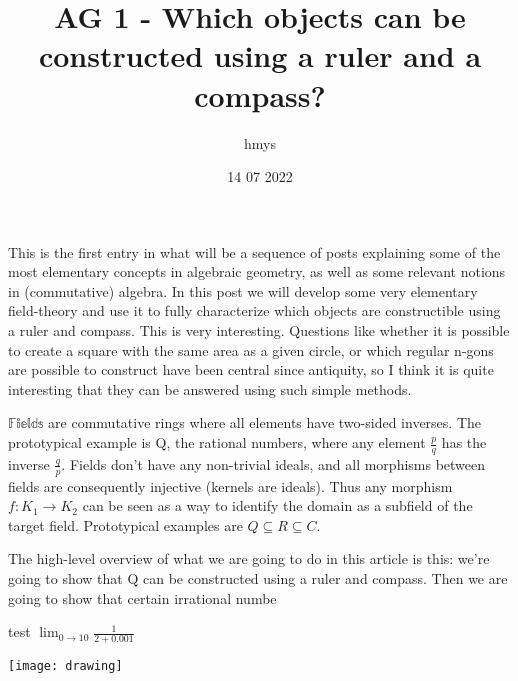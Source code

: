 \title{AG 1 - Which objects can be constructed using a ruler and a compass?}
\author{hmys}
\date{14 07 2022}

\maketitle

This is the first entry in what will be a sequence of posts explaining some of the most elementary concepts in algebraic geometry, as well as some relevant notions in (commutative) algebra. In this post we will develop some very elementary field-theory and use it to fully characterize which objects are constructible using a ruler and compass. This is very interesting. Questions like whether it is possible to create a square with the same area as a given circle, or which regular n-gons are possible to construct have been central since antiquity, so I think it is quite interesting that they can be answered using such simple methods. \newline

$\mathbb{Fields}$ are commutative rings where all elements have two-sided inverses. The prototypical example is Q, the rational numbers, where any element $\frac{p}{q}$ has the inverse $\frac{q}{p}$. Fields don't have any non-trivial ideals, and all morphisms between fields are consequently injective (kernels are ideals). Thus any morphism $f: K_{1} \to K_{2}$ can be seen as a way to identify the domain as a subfield of the target field. Prototypical examples are $Q \subseteq R \subseteq C$. \newline

The high-level overview of what we are going to do in this article is this: we're going to show that Q can be constructed using a ruler and compass. Then we are going to show that certain irrational numbe

\par
test $\lim_{0 \to 10} \frac{1}{2 + 0.001}$

\texttt{[image: drawing]} 


